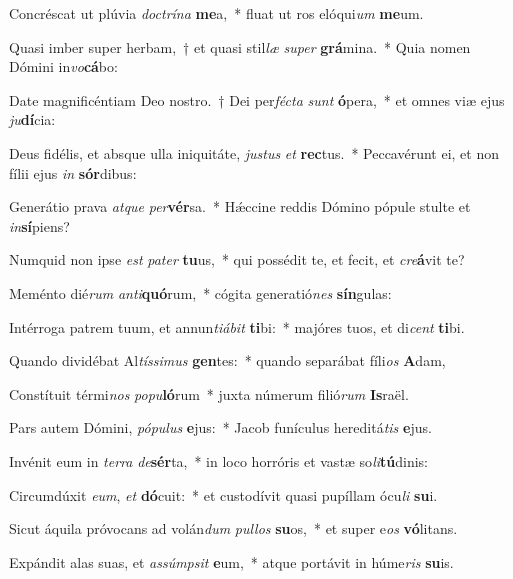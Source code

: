 \item Concréscat ut plúvia \textit{doc}\textit{trí}\textit{na} \textbf{me}a,~* fluat ut ros elóqui\textit{um} \textbf{me}um.
\item Quasi imber super herbam,~† et quasi stil\textit{læ} \textit{su}\textit{per} \textbf{grá}mina.~* Quia nomen Dómini in\textit{vo}\textbf{cá}bo:
\item Date magnificéntiam Deo nostro.~† Dei per\textit{féc}\textit{ta} \textit{sunt} \textbf{ó}pera,~* et omnes viæ ejus \textit{ju}\textbf{dí}cia:
\item Deus fidélis, et absque ulla iniquitáte, \textit{jus}\textit{tus} \textit{et} \textbf{rec}tus.~* Peccavérunt ei, et non fílii ejus \textit{in} \textbf{sór}dibus:
\item Generátio prava \textit{at}\textit{que} \textit{per}\textbf{vér}sa.~* Hǽccine reddis Dómino pópule stulte et \textit{in}\textbf{sí}piens?
\item Numquid non ipse \textit{est} \textit{pa}\textit{ter} \textbf{tu}us,~* qui possédit te, et fecit, et \textit{cre}\textbf{á}vit te?
\item Meménto dié\textit{rum} \textit{an}\textit{ti}\textbf{quó}rum,~* cógita generatió\textit{nes} \textbf{sín}gulas:
\item Intérroga patrem tuum, et annun\textit{ti}\textit{á}\textit{bit} \textbf{ti}bi:~* majóres tuos, et di\textit{cent} \textbf{ti}bi.
\item Quando dividébat Al\textit{tís}\textit{si}\textit{mus} \textbf{gen}tes:~* quando separábat fíli\textit{os} \textbf{A}dam,
\item Constítuit térmi\textit{nos} \textit{po}\textit{pu}\textbf{ló}rum~* juxta númerum filió\textit{rum} \textbf{Is}raël.
\item Pars autem Dómini, \textit{pó}\textit{pu}\textit{lus} \textbf{e}jus:~* Jacob funículus hereditá\textit{tis} \textbf{e}jus.
\item Invénit eum in \textit{ter}\textit{ra} \textit{de}\textbf{sér}ta,~* in loco horróris et vastæ so\textit{li}\textbf{tú}dinis:
\item Circumdúxit \textit{e}\textit{um}, \textit{et} \textbf{dó}cuit:~* et custodívit quasi pupíllam ócu\textit{li} \textbf{su}i.
\item Sicut áquila próvocans ad volán\textit{dum} \textit{pul}\textit{los} \textbf{su}os,~* et super e\textit{os} \textbf{vó}litans.
\item Expándit alas suas, et \textit{as}\textit{súmp}\textit{sit} \textbf{e}um,~* atque portávit in húme\textit{ris} \textbf{su}is.
